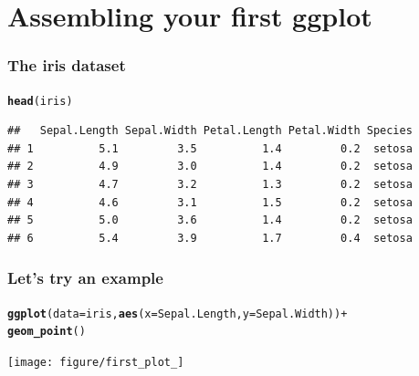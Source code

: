 \documentclass{beamer}\usepackage{graphicx, color}
\makeatletter
\newcommand{\hlfunctioncall}[1]{\textcolor[rgb]{0.501960784313725,0,0.329411764705882}{\textbf{#1}}}%
\newenvironment{kframe}{%
 \def\at@end@of@kframe{}%
 \ifinner\ifhmode%
  \def\at@end@of@kframe{\end{minipage}}%
  \begin{minipage}{\columnwidth}%
 \fi\fi%
 \def\FrameCommand##1{\hskip\@totalleftmargin \hskip-\fboxsep
 \colorbox{shadecolor}{##1}\hskip-\fboxsep
     \hskip-\linewidth \hskip-\@totalleftmargin \hskip\columnwidth}%
 \MakeFramed {\advance\hsize-\width
   \@totalleftmargin\z@ \linewidth\hsize
   \@setminipage}}%
 {\par\unskip\endMakeFramed%
 \at@end@of@kframe}
\newenvironment{knitrout}{}{} %
\makeatother
\begin{document}
\section*{Assembling your first ggplot}
\frame{\sectionpage}

\begin{frame}[fragile]
\frametitle{The iris dataset}
\begin{knitrout}\footnotesize
{}\color{fgcolor}\begin{kframe}
\begin{alltt}
\hlfunctioncall{head}(iris)
\end{alltt}
\begin{verbatim}
##   Sepal.Length Sepal.Width Petal.Length Petal.Width Species
## 1          5.1         3.5          1.4         0.2  setosa
## 2          4.9         3.0          1.4         0.2  setosa
## 3          4.7         3.2          1.3         0.2  setosa
## 4          4.6         3.1          1.5         0.2  setosa
## 5          5.0         3.6          1.4         0.2  setosa
## 6          5.4         3.9          1.7         0.4  setosa
\end{verbatim}
\end{kframe}
\end{knitrout}

\end{frame}

\begin{frame}[fragile]
\frametitle{Let's try an example}
\begin{knitrout}\footnotesize
{}\color{fgcolor}\begin{kframe}
\begin{alltt}
\hlfunctioncall{ggplot}(data = iris, \hlfunctioncall{aes}(x = Sepal.Length, y = Sepal.Width)) +
\hlfunctioncall{geom_point}()
\end{alltt}
\end{kframe}
\texttt{[image: figure/first\_plot\_]} 

\end{knitrout}

\end{frame}
\end{document}
